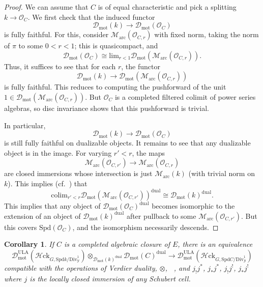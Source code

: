 \documentclass[11pt]{amsart}
\DeclareMathOperator{\sHom}{\!{\mathscr{H}\! om}}
\numberwithin{equation}{section}
\numberwithin{theorem}{section}
\newtheorem{corollary}[theorem]{Corollary}
\theoremstyle{definition}
\newcommand{\Hloc}{{\mathcal H}{\mathrm{ck}}}
\begin{document}
\begin{proof} We can assume that $C$ is of equal characteristic and pick a splitting $k\to \mathcal O_C$. We first check that the induced functor
\[
\mathcal D_{\mathrm{mot}}(k)\to \mathcal D_{\mathrm{mot}}(\mathcal O_C)
\]
is fully faithful. For this, consider $\mathcal M_{\mathrm{arc}}(\mathcal O_{C,r})$ with fixed norm, taking the norm of $\pi$ to some $0<r<1$; this is quasicompact, and
\[
\mathcal D_{\mathrm{mot}}(\mathcal O_C)\cong \mathrm{lim}_{r<1} \mathcal D_{\mathrm{mot}}(\mathcal M_{\mathrm{arc}}(\mathcal O_{C,r})).
\]
Thus, it suffices to see that for each $r$, the functor
\[
\mathcal D_{\mathrm{mot}}(k)\to \mathcal D_{\mathrm{mot}}(\mathcal M_{\mathrm{arc}}(\mathcal O_{C,r}))
\]
is fully faithful. This reduces to computing the pushforward of the unit $1\in \mathcal D_{\mathrm{mot}}(\mathcal M_{\mathrm{arc}}(\mathcal O_{C,r}))$. But $\mathcal O_C$ is a completed filtered colimit of power series algebras, so disc invariance shows that this pushforward is trivial.

In particular,
\[
\mathcal D_{\mathrm{mot}}(k)\to \mathcal D_{\mathrm{mot}}(\mathcal O_C)
\]
is still fully faithful on dualizable objects. It remains to see that any dualizable object is in the image. For varying $r'<r$, the maps
\[
\mathcal M_{\mathrm{arc}}(\mathcal O_{C,r'})\to \mathcal M_{\mathrm{arc}}(\mathcal O_{C,r})
\]
are closed immersions whose intersection is just $\mathcal M_{\mathrm{arc}}(k)$ (with trivial norm on $k$). This implies (cf.~\cite[Lemma 10.4, 10.5]{BerkovichMotives}) that
\[
\mathrm{colim}_{r'<r} \mathcal D_{\mathrm{mot}}(\mathcal M_{\mathrm{arc}}(\mathcal O_{C,r'}))^{\mathrm{dual}}\cong \mathcal D_{\mathrm{mot}}(k)^{\mathrm{dual}}.
\]
This implies that any object of $\mathcal D_{\mathrm{mot}}(\mathcal O_C)^{\mathrm{dual}}$ becomes isomorphic to the extension of an object of $\mathcal D_{\mathrm{mot}}(k)^{\mathrm{dual}}$ after pullback to some $\mathcal M_{\mathrm{arc}}(\mathcal O_{C,r'})$. But this covers $\mathrm{Spd}(\mathcal O_C)$, and the isomorphism necessarily descends.
\end{proof}

\begin{corollary} If $C$ is a completed algebraic closure of $E$, there is an equivalence
\[
\mathcal D_{\mathrm{mot}}^{\mathrm{ULA}}(\Hloc_{G,\mathrm{Spd} k/\mathrm{Div}^1_{\mathcal Y}})\otimes_{\mathcal D_{\mathrm{mot}}(k)^{\mathrm{dual}}} \mathcal D_{\mathrm{mot}}(C)^{\mathrm{dual}}\to \mathcal D_{\mathrm{mot}}^{\mathrm{ULA}}(\Hloc_{G,\mathrm{Spd} C/\mathrm{Div}^1_{\mathcal Y}})
\]
compatible with the operations of Verdier duality, $\otimes$, $\sHom$, and $j_! j^\ast$, $j_\ast j^\ast$, $j_! j^!$, $j_\ast j^!$ where $j$ is the locally closed immersion of any Schubert cell.
\end{corollary}
\end{document}
